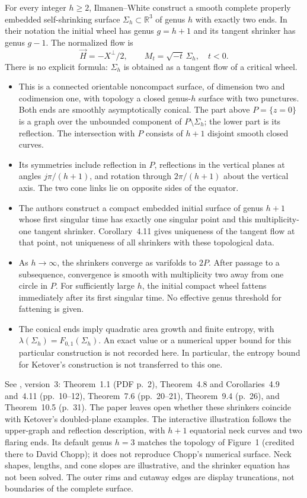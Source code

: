 \begin{example}\label{ex:catalogue-iw-two-ended}
For every integer $h\geq2$, Ilmanen--White construct a smooth complete properly embedded self-shrinking surface $\Sigma_h\subset\mathbb R^3$ of genus $h$ with exactly two ends. In their notation the initial wheel has genus $g=h+1$ and its tangent shrinker has genus $g-1$. The normalized flow is
\[
 \vec H=-X^\perp/2,\qquad M_t=\sqrt{-t}\,\Sigma_h,\quad t<0.
\]
There is no explicit formula: $\Sigma_h$ is obtained as a tangent flow of a critical wheel.
\begin{itemize}
\item This is a connected orientable noncompact surface, of dimension two and codimension one, with topology a closed genus-$h$ surface with two punctures. Both ends are smoothly asymptotically conical. The part above $P=\{z=0\}$ is a graph over the unbounded component of $P\setminus\Sigma_h$; the lower part is its reflection. The intersection with $P$ consists of $h+1$ disjoint smooth closed curves.
\item Its symmetries include reflection in $P$, reflections in the vertical planes at angles $j\pi/(h+1)$, and rotation through $2\pi/(h+1)$ about the vertical axis. The two cone links lie on opposite sides of the equator.
\item The authors construct a compact embedded initial surface of genus $h+1$ whose first singular time has exactly one singular point and this multiplicity-one tangent shrinker. Corollary~4.11 gives uniqueness of the tangent flow at that point, not uniqueness of all shrinkers with these topological data.
\item As $h\to\infty$, the shrinkers converge as varifolds to $2P$. After passage to a subsequence, convergence is smooth with multiplicity two away from one circle in $P$. For sufficiently large $h$, the initial compact wheel fattens immediately after its first singular time. No effective genus threshold for fattening is given.
\item The conical ends imply quadratic area growth and finite entropy, with $\lambda(\Sigma_h)=F_{0,1}(\Sigma_h)$. An exact value or a numerical upper bound for this particular construction is not recorded here. In particular, the entropy bound for Ketover's construction is not transferred to this one.
\end{itemize}
See \cite{CatIlmanenWhite2025}, version~3: Theorem~1.1 (PDF p.~2), Theorem~4.8 and Corollaries~4.9 and~4.11 (pp.~10--12), Theorem~7.6 (pp.~20--21), Theorem~9.4 (p.~26), and Theorem~10.5 (p.~31). The paper leaves open whether these shrinkers coincide with Ketover's doubled-plane examples. The interactive illustration follows the upper-graph and reflection description, with $h+1$ equatorial neck curves and two flaring ends. Its default genus $h=3$ matches the topology of Figure~1 (credited there to David Chopp); it does not reproduce Chopp's numerical surface. Neck shapes, lengths, and cone slopes are illustrative, and the shrinker equation has not been solved. The outer rims and cutaway edges are display truncations, not boundaries of the complete surface.
\end{example}

